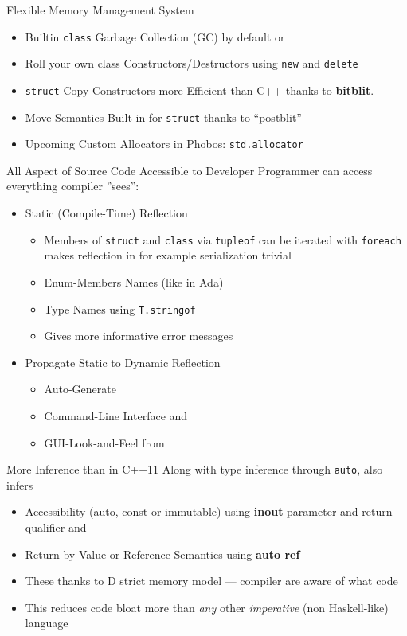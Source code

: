 \documentclass[xcolor=dvipsnames]{beamer}
\begin{document}
\begin{frame}[fragile]{Flexible Memory Management System}
  \begin{itemize}[<+->]
  \item Builtin \texttt{class} Garbage Collection (GC) by default  or
  \item Roll your own class Constructors/Destructors using \texttt{new} and
    \texttt{delete}
  \item \texttt{struct} Copy Constructors more Efficient than C++ thanks to
    \textbf{bitblit}.
  \item Move-Semantics Built-in for \texttt{struct} thanks to “postblit”
  \item Upcoming Custom Allocators in Phobos:  \texttt{std.allocator}
  \end{itemize}
\end{frame}

\begin{frame}[fragile]{All Aspect of Source Code Accessible to Developer}
  Programmer can access everything compiler ”sees”:
  \begin{itemize}[<+->]
  \item Static (Compile-Time) Reflection
    \begin{itemize}[<+->]
    \item Members of \texttt{struct} and \texttt{class} via \texttt{tupleof} can
      be iterated with \texttt{foreach} makes reflection in for example
      serialization trivial
    \item Enum-Members Names (like in Ada)
    \item Type Names using \texttt{T.stringof}
    \item Gives more informative error messages
    \end{itemize}
  \item Propagate Static to Dynamic Reflection
    \begin{itemize}[<+->]
    \item Auto-Generate
    \item Command-Line Interface and
    \item GUI-Look-and-Feel from
    \end{itemize}
  \end{itemize}
\end{frame}

\begin{frame}[fragile]{More Inference than in C++11}
  Along with type inference through \texttt{auto}, also infers
  \begin{itemize}[<+->]
  \item Accessibility (auto, const or immutable) using \textbf{inout} parameter
    and return qualifier and
  \item Return by Value or Reference Semantics using \textbf{auto ref}
  \item These thanks to D strict memory model --- compiler are aware of what code
  \item This reduces code bloat more than \emph{any} other \emph{imperative}
    (non Haskell-like) language
  \end{itemize}
\end{frame}
\end{document}
